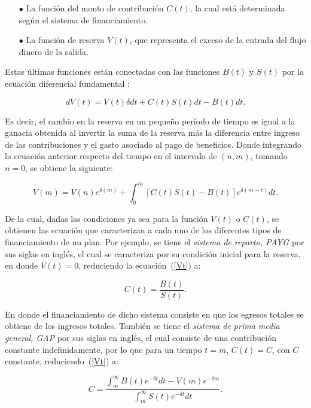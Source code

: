 \documentclass[12pt,letterpaper,titlepage]{article}
\begin{document}
 \begin{itemize}
 	\item [$\bullet$] La función del monto de contribución $C(t)$, la cual está determinada según el sistema de financiamiento.
 	\item [$\bullet$] La función de reserva $V(t)$, que representa el exceso de la entrada del flujo dinero de la salida.
 \end{itemize}

Estas últimas funciones están conectadas con las funciones $B(t)$ y $S(t)$ por la ecuación diferencial fundamental \cite[p. 15]{778}:

\begin{equation}\label{dV}
dV(t)=V(t)\delta dt+C(t)S(t)dt-B(t)dt.
\end{equation}

Es decir, el cambio en la reserva en un pequeño período de tiempo es igual a la ganacia obtenida al invertir la suma de la reserva más la diferencia entre ingreso de las contribuciones y el gasto asociado al pago de beneficios. Donde integrando la ecuación anterior respecto del tiempo en el intervalo de $(n,m)$, tomando $n=0$, se obtiene la siguiente:

\begin{equation}\label{Vt}
V(m)=V(n)e^{\delta(m)}+\int_{0}^m[C(t)S(t)-B(t)]e^{\delta(m-t)}dt.
\end{equation}

De la cual, dadas las condiciones ya sea para la función $V(t)$ o $C(t)$, se obtienen las ecuación que caracterizan a cada uno de los diferentes tipos de financiamiento de un plan. Por ejemplo, se tiene el \textit{sistema de reparto, PAYG} por sus siglas en inglés, el cual se caracteriza por su condición inicial para la reserva, en donde $V(t)=0$, reduciendo la ecuación~(\ref{Vt}) a:

\begin{equation}\label{payg}
C(t)=\frac{B(t)}{S(t)}.
\end{equation}

En donde el financiamiento de dicho sistema consiste en que los egresos totales se obtiene de los ingresos totales. También se tiene el \textit{sistema de prima media general, GAP} por sus siglas en inglés, el cual consiste de una contribución constante indefinidamente, por lo que para un tiempo $t=m$, $C(t)=C$, con $C$ constante, reduciendo~(\ref{Vt}) a:

\begin{equation}\label{gap}
C=\dfrac{\int_{m}^{\infty}B(t)e^{-\delta t}dt-V(m)e^{-\delta m}}{\int^{\infty}_{m}S(t)e^{-\delta t}dt}.
\end{equation}
\end{document}
